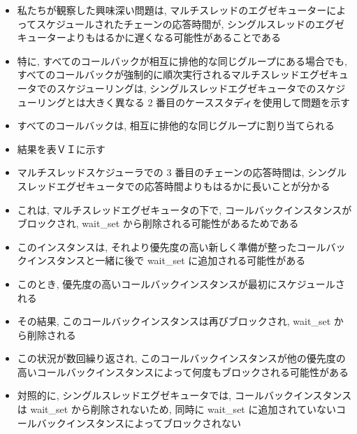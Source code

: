 \begin{frame}{}
    \begin{itemize}
        \item 私たちが観察した興味深い問題は, マルチスレッドのエグゼキューターによってスケジュールされたチェーンの応答時間が, シングルスレッドのエグゼキューターよりもはるかに遅くなる可能性があることである
\item 特に, すべてのコールバックが相互に排他的な同じグループにある場合でも, すべてのコールバックが強制的に順次実行されるマルチスレッドエグゼキュータでのスケジューリングは, シングルスレッドエグゼキュータでのスケジューリングとは大きく異なる 2 番目のケーススタディを使用して問題を示す
\item すべてのコールバックは, 相互に排他的な同じグループに割り当てられる
    \end{itemize}
\end{frame}

\begin{frame}{}
    \begin{itemize}
        \item 結果を表ＶＩに示す
\item マルチスレッドスケジューラでの 3 番目のチェーンの応答時間は, シングルスレッドエグゼキュータでの応答時間よりもはるかに長いことが分かる
\item これは, マルチスレッドエグゼキュータの下で, コールバックインスタンスがブロックされ, wait\_set から削除される可能性があるためである
\item このインスタンスは, それより優先度の高い新しく準備が整ったコールバックインスタンスと一緒に後で wait\_set に追加される可能性がある
\item このとき, 優先度の高いコールバックインスタンスが最初にスケジュールされる
\item その結果, このコールバックインスタンスは再びブロックされ, wait\_set から削除される
\item この状況が数回繰り返され, このコールバックインスタンスが他の優先度の高いコールバックインスタンスによって何度もブロックされる可能性がある
\item 対照的に, シングルスレッドエグゼキュータでは, コールバックインスタンスは wait\_set から削除されないため, 同時に wait\_set に追加されていないコールバックインスタンスによってブロックされない
    \end{itemize}
\end{frame}

